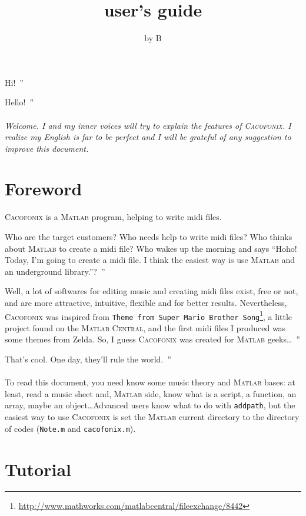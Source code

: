 \documentclass{article}
\title{\cacofonix user's guide}
\author{by B}
\date{}
\newcommand{\cacofonix}{\textsc{Cacofonix}\xspace}
\newcommand{\matlab}{\textsc{Matlab}\xspace}
\newcommand{\file}[1]{\texttt{#1}\xspace}
\newcommand{\noteFile}{\file{Note.m}}
\newcommand{\cacofonixFile}{\file{cacofonix.m}}
\newcommand{\exchange}[2]{\texttt{#1}\footnote{\url{#2}}\xspace}
\newenvironment{meenv}{ \par \noindent \makebox[6em][r]{ \textcolor{mecolor}{Me}: `` --~}}{~''}
\newenvironment{myselfenv}{ \par \noindent \makebox[6em][r]{ \textcolor{myselfcolor}{Myself}: `` --~}}{~''}
\newcommand{\me}[1]{\begin{meenv}#1\end{meenv}}
\newcommand{\myself}[1]{\begin{myselfenv}#1\end{myselfenv}}
\begin{document}
\maketitle

\me{Hi!}
\myself{Hello!}

\paragraph{}

\emph{Welcome. I and my inner voices will try to explain the features of \cacofonix. I realize my English is far to be perfect and I will be grateful of any suggestion to improve this document.}

\tableofcontents

\section{Foreword}

\cacofonix is a \matlab program, helping to write midi files.

\me{Who are the target customers? Who needs help to write midi files? Who thinks about \matlab to create a midi file? Who wakes up the morning and says ``Hoho! Today, I'm going to create a midi file. I think the easiest way is use \matlab and an underground library.''?}
\myself{Well, a lot of softwares for editing music and creating midi files exist, free or not, and are more attractive, intuitive, flexible and for better results. Nevertheless, \cacofonix was inspired from \exchange{Theme from Super Mario Brother Song}{http://www.mathworks.com/matlabcentral/fileexchange/8442}, a little project found on the \textsc{Matlab Central}, and the first midi files I produced was some themes from Zelda. So, I guess \cacofonix was created for \matlab geeks\dots}
\me{That's cool. One day, they'll rule the world.}

\paragraph{}

To read this document, you need know some music theory and \matlab bases: at least, read a music sheet and, \matlab side, know what is a script, a function, an array, maybe an object\dots Advanced users know what to do with \lstinline!addpath!, but the easiest way to use \cacofonix is set the \matlab current directory to the directory of codes (\noteFile and \cacofonixFile).

\section{Tutorial}
\end{document}
